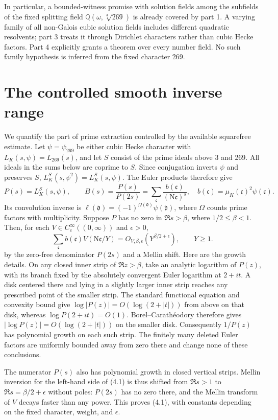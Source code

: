 \documentclass[11pt]{article}
\newcommand{\Q}{\mathbb Q}
\newcommand{\N}{\mathrm N}
\begin{document}
In particular, a bounded-witness promise with solution fields among
the subfields of the fixed splitting field
$\Q(\omega,\sqrt[3]{269})$ is already covered by part 1.
A varying family of all non-Galois cubic solution fields includes
different quadratic resolvents; part 3 treats it through Dirichlet
characters rather than cubic Hecke factors.
Part 4 explicitly grants a theorem over every number field.
No such family hypothesis is inferred from the fixed character 269.

\section{The controlled smooth inverse range}
We quantify the part of prime extraction controlled by the available
squarefree estimate.
Let $\psi=\psi_{269}$ be either cubic Hecke character with
$L_K(s,\psi)=L_{269}(s)$, and let $S$ consist of the prime ideals
above 3 and 269. All ideals in the sums below are coprime to $S$.
Since conjugation inverts $\psi$ and preserves $S$,
$L_K^S(s,\psi^2)=L_K^S(s,\psi)$.
The Euler products therefore give
\[
 P(s)=L_K^{S}(s,\psi),\qquad
 B(s)=\frac{P(s)}{P(2s)}
       =\sum_{\mathfrak c}\frac{b(\mathfrak c)}{(\N\mathfrak c)^s},
 \quad b(\mathfrak c)=\mu_K(\mathfrak c)^2\psi(\mathfrak c).
\]
Its convolution inverse is
$\ell(\mathfrak d)=(-1)^{\Omega(\mathfrak d)}\psi(\mathfrak d)$,
where $\Omega$ counts prime factors with multiplicity.
Suppose $P$ has no zero in $\Re s>\beta$, where $1/2\le\beta<1$.
Then, for each
$V\in C_c^\infty((0,\infty))$ and $\epsilon>0$,
\[
 \sum_{\mathfrak c}b(\mathfrak c)V(\N\mathfrak c/Y)
       =O_{V,\beta,\epsilon}(Y^{\beta/2+\epsilon}),\qquad Y\ge1.    \tag{4.1}
\]
by the zero-free denominator $P(2s)$ and a Mellin shift.
Here are the growth details. On any closed inner strip of
$\Re z>\beta$, take an analytic logarithm of $P(z)$, with its
branch fixed by the absolutely convergent Euler logarithm at
$2+it$. A disk centered there and lying in a slightly larger
inner strip reaches any prescribed point of the smaller strip.
The standard functional equation and convexity bound give
$\log|P(z)|=O(\log(2+|t|))$ from above on that disk, whereas
$\log P(2+it)=O(1)$. Borel--Carath\'eodory therefore gives
$|\log P(z)|=O(\log(2+|t|))$ on the smaller disk.
Consequently $1/P(z)$ has polynomial growth on each such strip.
The finitely many deleted Euler factors are uniformly bounded
away from zero there and change none of these conclusions.

The numerator $P(s)$ also has polynomial growth in closed vertical
strips. Mellin inversion for the left-hand side of (4.1) is thus
shifted from $\Re s>1$ to $\Re s=\beta/2+\epsilon$ without poles:
$P(2s)$ has no zero there, and the Mellin transform of $V$
decays faster than any power. This proves (4.1), with constants
depending on the fixed character, weight, and $\epsilon$.
\end{document}
